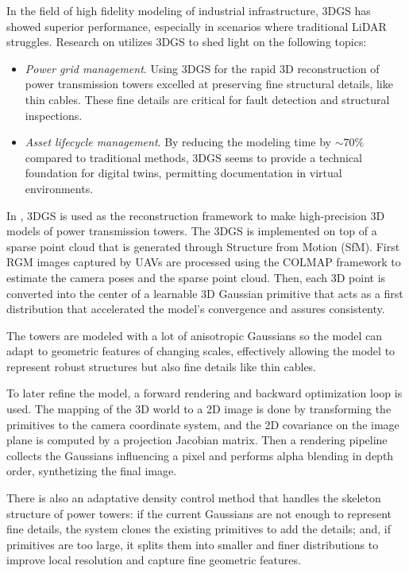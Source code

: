 \documentclass[
	a4paper, %
	10pt, %
	unnumberedsections, %
	twoside, %
]{LTJournalArticle}
\begin{document}
In the field of high fidelity modeling of industrial infrastructure, 3DGS has showed superior performance, especially in scenarios where traditional LiDAR struggles. Research on \cite{powergrid_3dgs} utilizes 3DGS to shed light on the following topics:
\begin{itemize}
	\item \textit{Power grid management}. Using 3DGS for the rapid 3D reconstruction of power transmission towers excelled at preserving fine structural details, like thin cables. These fine details are critical for fault detection and structural inspections.
	\item \textit{Asset lifecycle management}. By reducing the modeling time by $\sim 70\%$ compared to traditional methods, 3DGS seems to provide a technical foundation for digital twins, permitting documentation in virtual environments.
\end{itemize}

In \cite{powergrid_3dgs}, 3DGS is used as the reconstruction framework to make high-precision 3D models of power transmission towers. The 3DGS is implemented on top of a sparse point cloud that is generated through Structure from Motion (SfM). First RGM images captured by UAVs are processed using the COLMAP framework to estimate the camera poses and the sparse point cloud. Then, each 3D point is converted into the center of a learnable 3D Gaussian primitive that acts as a first distribution that accelerated the model's convergence and assures consistenty.

The towers are modeled with a lot of anisotropic Gaussians so the model can adapt to geometric features of changing scales, effectively allowing the model to represent robust structures but also fine details like thin cables. 

To later refine the model, a forward rendering and backward optimization loop is used. The mapping of the 3D world to a 2D image is done by transforming the primitives to the camera coordinate system, and the 2D covariance on the image plane is computed by a projection Jacobian matrix. Then a rendering pipeline collects the Gaussians influencing a pixel and performs alpha blending in depth order, synthetizing the final image.

There is also an adaptative density control method that handles the skeleton structure of power towers: if the current Gaussians are not enough to represent fine details, the system clones the existing primitives to add the details; and, if primitives are too large, it splits them into smaller and finer distributions to improve local resolution and capture fine geometric features.
\end{document}
